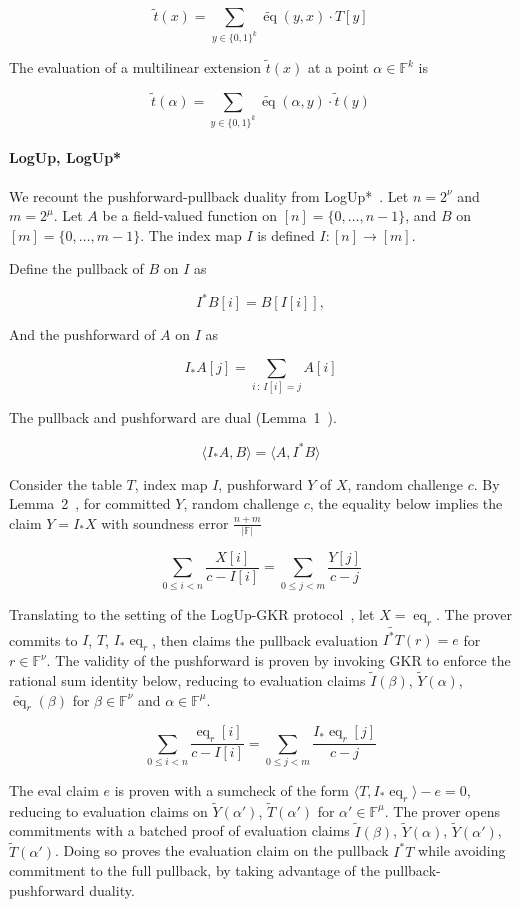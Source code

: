 $$
\widetilde{t}(x) = \sum_{y \in \{0,1\}^k} \widetilde{\operatorname{eq}}(y, x) \cdot T[y]
$$

The evaluation of a multilinear extension $\widetilde{t}(x)$ at a point $\alpha\in\mathbb{F}^k$ is

$$
\widetilde{t}(\alpha) = \sum_{y \in \{0,1\}^k} \widetilde{\operatorname{eq}}(\alpha, y) \cdot \widetilde{t}(y)
$$



\paragraph{LogUp, LogUp*}

We recount the pushforward-pullback duality 
from LogUp*~\cite{cryptoeprint:2025/946}. Let $n=2^\nu$ and $m=2^\mu$. Let $A$ be a field-valued
function on $[n] = \{0, \ldots, n-1\}$, and $B$ on 
$[m] = \{0, \ldots, m-1\}$. The index map $I$ is defined
$I: [n] \rightarrow [m]$. 

Define the pullback of $B$ on $I$ as

\[
I^{*}B[i] = B[I[i]],
\]

And the pushforward of $A$ on $I$ as

\[
I_{*}A[j] = \sum_{i\,:\,I[i]=j} A[i]
\]

The pullback and pushforward are dual (Lemma~1~\cite{cryptoeprint:2025/946}).

\[
\langle I_{*}A, B\rangle = \langle A, I^{*}B\rangle
\]

Consider the table $T$, index map $I$, pushforward $Y$ of $X$, 
random challenge $c$.
By Lemma~2~\cite{cryptoeprint:2025/946}, for committed $Y$, random challenge
$c$, the equality below implies the claim $Y = I_*X$ with soundness error 
$\frac{n + m}{|\mathbb{F}|}$

\[
\sum_{0\le i<n}\frac{X[i]}{c-I[i]} = \sum_{0\le j<m}\frac{Y[j]}{c-j}
\]

Translating to the setting of the LogUp-GKR 
protocol~\cite{cryptoeprint:2023/1284}, let \(X = \operatorname{eq}_r\). The prover 
commits to \(I\), \(T\), \(I_*\operatorname{eq}_r\), then claims the pullback evaluation 
\(\widetilde{I^*T}(r) = e\) for \(r\in\mathbb{F}^\nu\). The validity of the pushforward is proven 
by invoking GKR to enforce the rational sum identity below,
reducing to evaluation claims \(\widetilde{I}(\beta)\), \(\widetilde{Y}(\alpha)\), \(\widetilde{\operatorname{eq}}_r(\beta)\)
for \(\beta\in\mathbb{F}^\nu\) and \(\alpha\in\mathbb{F}^\mu\). 

\[
\sum_{0\le i<n}\frac{\operatorname{eq}_r[i]}{c-I[i]} = \sum_{0\le j<m}\frac{I_*\operatorname{eq}_r[j]}{c-j}
\]

The eval claim \(e\) is proven with a sumcheck of the form
\(\langle T, I_*\operatorname{eq}_r \rangle - e = 0\), reducing to evaluation claims 
on \(\widetilde{Y}(\alpha')\), \(\widetilde{T}(\alpha')\) for \(\alpha'\in\mathbb{F}^\mu\). 
The prover opens commitments with a batched proof of evaluation claims
\(\widetilde{I}(\beta)\), \(\widetilde{Y}(\alpha)\), \(\widetilde{Y}(\alpha')\), \(\widetilde{T}(\alpha')\).
Doing so proves the evaluation claim on the pullback \(I^*T\) while avoiding
commitment to the full pullback, by taking advantage of the
pullback-pushforward duality.
